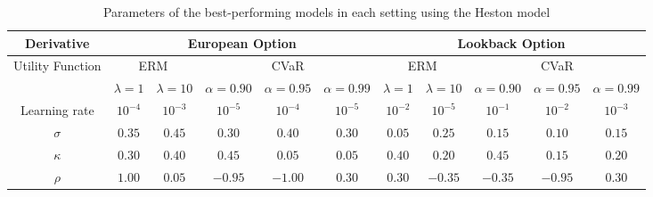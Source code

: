 \begin{table*}[htb]
    \caption{Parameters of the best-performing models in each setting using the Heston model}
    \label{tab:tuning-results-heston}
    \centering
    \begin{tabular}{c||c|c|c|c|c||c|c|c|c|c}
        \hline
        Derivative                        & \multicolumn{5}{c||}{European Option} & \multicolumn{5}{c}{Lookback Option}                                                                                                                                                    \\\hline
        \multirow{2}{*}{Utility Function} & \multicolumn{2}{c|}{ERM}              & \multicolumn{3}{c||}{CVaR}          & \multicolumn{2}{c|}{ERM} & \multicolumn{3}{c}{CVaR}                                                                                              \\
                                          & $\lambda=1$                           & $\lambda=10$                        & $\alpha=0.90$            & $\alpha=0.95$            & $\alpha=0.99$ & $\lambda=1$ & $\lambda=10$ & $\alpha=0.90$ & $\alpha=0.95$ & $\alpha=0.99$ \\\hline\hline
        Learning rate                     & $10^{-4}$                             & $10^{-3}$                           & $10^{-5}$                & $10^{-4}$                & $10^{-5}$     & $10^{-2}$   & $10^{-5}$    & $10^{-1}$     & $10^{-2}$     & $10^{-3}$     \\
        $\sigma$                          & $0.35$                                & $0.45$                              & $0.30$                   & $0.40$                   & $0.30$        & $0.05$      & $0.25$       & $0.15$        & $0.10$        & $0.15$        \\
        $\kappa$                          & $0.30$                                & $0.40$                              & $0.45$                   & $0.05$                   & $0.05$        & $0.40$      & $0.20$       & $0.45$        & $0.15$        & $0.20$        \\
        $\rho$                            & $1.00$                                & $0.05$                              & $-0.95$                  & $-1.00$                  & $0.30$        & $0.30$      & $-0.35$      & $-0.35$       & $-0.95$       & $0.30$        \\
    \end{tabular}
\end{table*}

